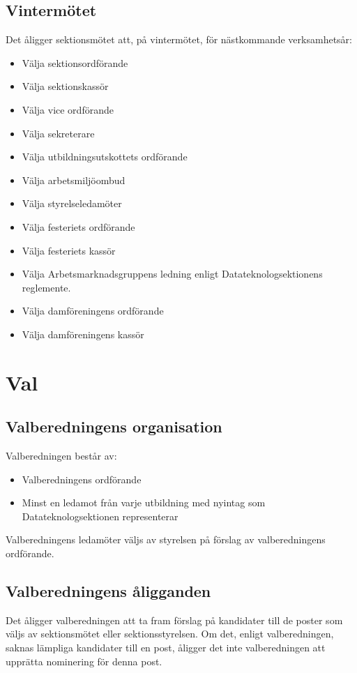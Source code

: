 \documentclass{datateknologsektionen-document}
\begin{document}
    \subsection{Vintermötet}
      Det åligger sektionsmötet att, på vintermötet, för nästkommande verksamhetsår:
      \begin{itemize}
        \item Välja sektionsordförande
        \item Välja sektionskassör
        \item Välja vice ordförande
        \item Välja sekreterare
        \item Välja utbildningsutskottets ordförande
        \item Välja arbetsmiljöombud
        \item Välja styrelseledamöter
        \item Välja festeriets ordförande
        \item Välja festeriets kassör
        \item Välja Arbetsmarknadsgruppens ledning enligt Datateknologsektionens reglemente.
        \item Välja damföreningens ordförande
        \item Välja damföreningens kassör 
      \end{itemize}

  \section{Val}
    \subsection{Valberedningens organisation}
      Valberedningen består av:
      \begin{itemize}
        \item Valberedningens ordförande
        \item Minst en ledamot från varje utbildning med nyintag som Datateknologsektionen representerar
      \end{itemize}
      Valberedningens ledamöter väljs av styrelsen på förslag av valberedningens ordförande.
    \subsection{Valberedningens åligganden}
      Det åligger valberedningen att ta fram förslag på kandidater till de poster som väljs av
      sektionsmötet eller sektionsstyrelsen. Om det, enligt valberedningen, saknas lämpliga
      kandidater till en post, åligger det inte valberedningen att upprätta nominering för denna
      post.
\end{document}
